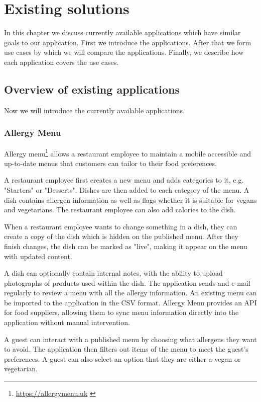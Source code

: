 \chapter{Existing solutions}
In this chapter we discuss currently available applications which have similar goals to our application.
First we introduce the applications.
After that we form use cases by which we will compare the applications.
Finally, we describe how each application covers the use cases.

\section{Overview of existing applications}
Now we will introduce the currently available applications.

\subsection*{Allergy Menu}
  Allergy menu\footnote{\url{https://allergymenu.uk}  \label{fnlabel}} allows a restaurant employee to maintain a mobile accessible and up-to-date menus that customers can tailor to their food preferences.
  
  A restaurant employee first creates a new menu and adds categories to it, e.g. "Starters" or "Desserts".
  Dishes are then added to each category of the menu.
  A dish contains allergen information as well as flags whether it is suitable for vegans and vegetarians.
  The restaurant employee can also add calories to the dish.

  When a restaurant employee wants to change something in a dish, they can create a copy of the dish which is hidden on the published menu.
  After they finish changes, the dish can be marked as "live", making it appear on the menu with updated content. 

  A dish can optionally contain internal notes, with the ability to upload photographs of products used within the dish.
  The application sends and e-mail regularly to review a menu with all the allergy information.
  An existing menu can be imported to the application in the CSV format.
  Allergy Menu provides an API for food suppliers, allowing them to sync menu information directly into the application without manual intervention.
  
  A guest can interact with a published menu by choosing what allergens they want to avoid.
  The application then filters out items of the menu to meet the guest's preferences.
  A guest can also select an option that they are either a vegan or vegetarian.
  
